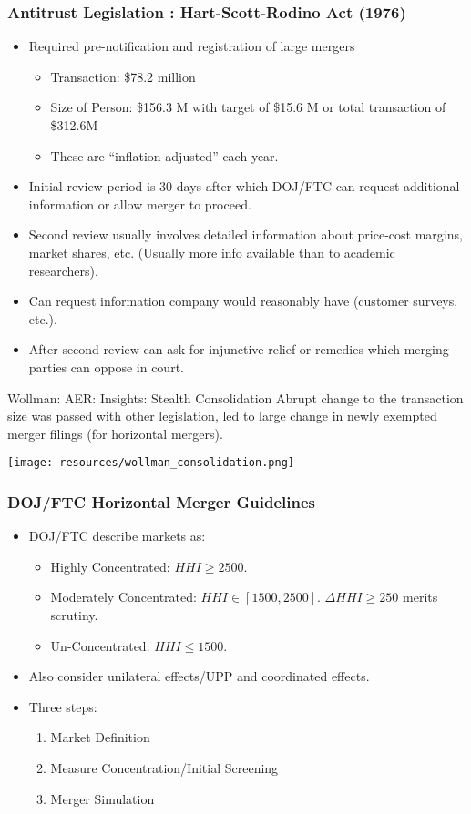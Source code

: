 \begin{frame}
\frametitle{Antitrust Legislation : Hart-Scott-Rodino Act (1976)}
 \begin{itemize}
\item Required pre-notification and registration of large mergers
\begin{itemize}
\item Transaction: \$78.2 million
\item Size of Person: \$156.3 M with target of \$15.6 M or total transaction of \$312.6M
\item These are ``inflation adjusted'' each year.
\end{itemize}
\item Initial review period is 30 days after which DOJ/FTC can request additional information or allow merger to proceed.
\item Second review usually involves detailed information about  price-cost margins, market shares, etc. (Usually more info available than to academic researchers).
\item Can request information company would reasonably have (customer surveys, etc.).
\item After second review can ask for \alert{injunctive relief} or \alert{remedies} which merging parties can oppose in court.
 \end{itemize}
\end{frame}

\begin{frame}{Wollman: AER: Insights: Stealth Consolidation}
Abrupt change to the transaction size was passed with other legislation, led to large change in newly exempted merger filings (for horizontal mergers).
\begin{center}
\texttt{[image: resources/wollman\_consolidation.png]}
\end{center}
\end{frame}

\begin{frame}
\frametitle{DOJ/FTC Horizontal Merger Guidelines}
 \begin{itemize}
\item DOJ/FTC describe markets as:
\begin{itemize}
\item Highly Concentrated: $HHI \geq 2500$.
\item Moderately Concentrated: $HHI \in [1500,2500]$. $\Delta HHI \geq 250$ merits scrutiny.
\item Un-Concentrated: $HHI \leq 1500$.
\end{itemize}
\item Also consider \alert{unilateral effects}/UPP and \alert{coordinated effects}.
\item Three steps:
\begin{enumerate}
\item Market Definition
\item Measure Concentration/Initial Screening
\item Merger Simulation
\end{enumerate}
 \end{itemize}
\end{frame}


